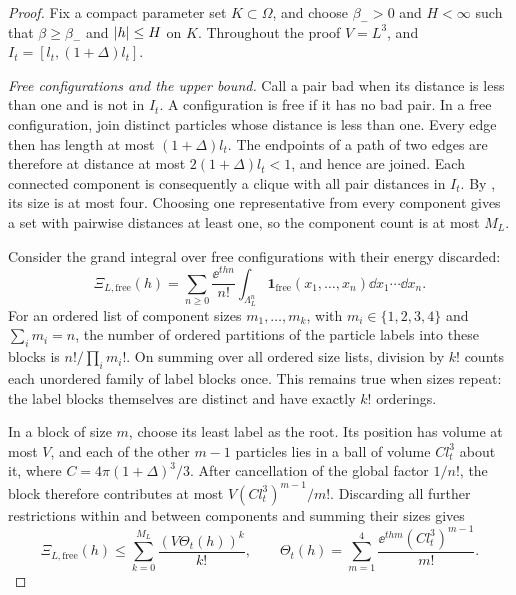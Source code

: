 \begin{proof}
Fix a compact parameter set \(K\subset\Omega\), and choose
\(\beta_->0\) and \(H<\infty\) such that
\(\beta\ge\beta_-\) and \(\left|h\right|\le H\) on \(K\).
Throughout the proof \(V=L^3\), and
\(I_t=[l_t,(1+\Delta)l_t]\).

\emph{Free configurations and the upper bound.}
Call a pair bad when its distance is less than one and is not in \(I_t\).
A configuration is free if it has no bad pair.  In a free configuration,
join distinct particles whose distance is less than one.  Every edge then
has length at most \((1+\Delta)l_t\).  The endpoints of a path of two
edges are therefore at distance at most \(2(1+\Delta)l_t<1\), and hence
are joined.  Each connected component is consequently a clique with all
pair distances in \(I_t\).  By , its size is at most
four.  Choosing one representative
from every component gives a set with pairwise distances at least one,
so the component count is at most \(M_L\).

Consider the grand integral over free configurations with their energy
discarded:
\[
 \Xi_{L,\mathrm{free}}(h)
 =\sum_{n\ge0}\frac{\ee^{thn}}{n!}
       \int_{\Lambda_L^n}\mathbf 1_{\mathrm{free}}(x_1,\ldots,x_n)
          \dd x_1\cdots\dd x_n.
\]
For an ordered list of component sizes \(m_1,\ldots,m_k\), with
\(m_i\in\{1,2,3,4\}\) and \(\sum_i m_i=n\), the number of ordered
partitions of the particle labels into these blocks is
\(n!/\prod_i m_i!\).  On summing over all ordered size lists, division
by \(k!\) counts each unordered family of label blocks once.  This
remains true when sizes repeat: the label blocks themselves are distinct
and have exactly \(k!\) orderings.

In a block of size \(m\), choose its least label as the root.  Its position has volume
at most \(V\), and each of the other \(m-1\) particles lies in a ball of
volume \(C l_t^3\) about it, where \(C=4\pi(1+\Delta)^3/3\).
After cancellation of the global factor \(1/n!\), the block therefore
contributes at most \(V(C l_t^3)^{m-1}/m!\).  Discarding all further
restrictions within and between components and summing their sizes gives
\begin{equation}
 \Xi_{L,\mathrm{free}}(h)
 \le\sum_{k=0}^{M_L}\frac{(V\Theta_t(h))^k}{k!},
 \qquad
 \Theta_t(h)=\sum_{m=1}^4
       \frac{\ee^{thm}(C l_t^3)^{m-1}}{m!}.
 \label{i:rooted-count}
\end{equation}


\end{proof}
